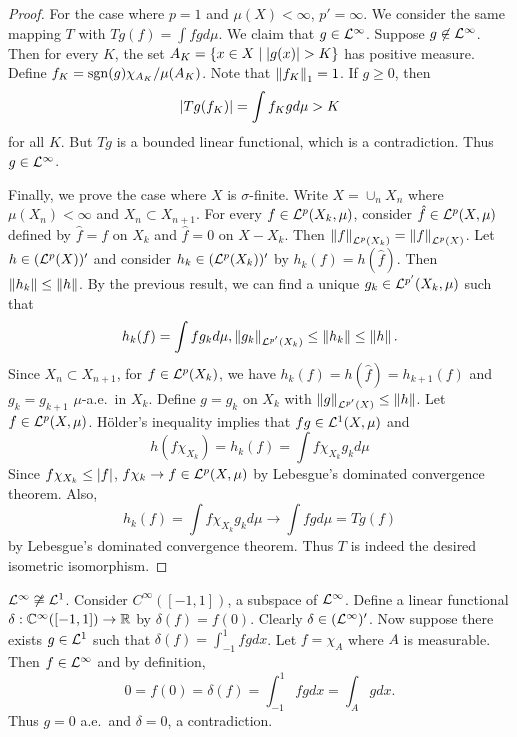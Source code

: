 \begin{proof}
    For the case where $p=1$ and $\mu(X)<\infty$, $p'=\infty$. 
    We consider the same mapping $T$ with $Tg(f) = \int fg d\mu$. 
    We claim that $g\in\mathcal{L}^\infty$. Suppose $g\not\in\mathcal{L}^\infty$. 
    Then for every $K$, the set $A_K = \left\{ x\in X \;\middle\vert\; \left\lvert {g(x)} \right\rvert>K \right\}$ 
    has positive measure. Define $f_K = \operatorname{sgn}(g)\chi_{A_K}/\mu(A_K)$. 
    Note that $\left\lVert {f_K} \right\rVert_1 = 1$. If $g\geq 0$, then 
    \begin{equation*}
        \left\lvert {Tg(f_K)} \right\rvert = \int f_Kgd\mu > K
    \end{equation*}
    for all $K$. But $Tg$ is a bounded linear functional, 
    which is a contradiction. Thus $g\in\mathcal{L}^\infty$. 

    Finally, we prove the case where $X$ is $\sigma$-finite. 
    Write $X = \cup_n X_n$ where $\mu(X_n)<\infty$ and $X_n\subset 
    X_{n+1}$. For every $f\in\mathcal{L}^p(X_k,\mu)$, consider 
    $\hat{f}\in\mathcal{L}^p(X,\mu)$ defined by $\hat{f} = f$ on $X_k$ 
    and $\hat{f} = 0$ on $X-X_k$. Then $\left\lVert {f} \right\rVert_{\mathcal{L}^p(X_k)} 
    = \left\lVert {f} \right\rVert_{\mathcal{L}^p(X)}$. Let $h\in(\mathcal{L}^p(X))'$ and consider 
    $h_k\in (\mathcal{L}^p(X_k))'$ by $h_k(f) = h(\hat{f})$. Then 
    $\left\lVert {h_k} \right\rVert\leq\left\lVert {h} \right\rVert$. By the previous result, we can 
    find a unique $g_k\in\mathcal{L}^{p'}(X_k,\mu)$ such that 
    \begin{equation*}
        h_k(f) = \int f g_k d\mu, \left\lVert {g_k} \right\rVert_{\mathcal{L}^{p'}(X_k)} 
        \leq \left\lVert {h_k} \right\rVert \leq \left\lVert {h} \right\rVert.
    \end{equation*}
    Since $X_n\subset X_{n+1}$, for $f\in\mathcal{L}^p(X_k)$, we have 
    $h_k(f) = h(\hat{f}) = h_{k+1}(f)$ and $g_k = g_{k+1}$ 
    $\mu$-a.e.\ in $X_k$. Define $g = g_k$ on $X_k$ with 
    $\left\lVert {g} \right\rVert_{\mathcal{L}^{p'}(X)}\leq \left\lVert {h} \right\rVert$. Let $f\in\mathcal{L}^p(X,\mu)$. 
    H\"older's inequality implies that $fg\in\mathcal{L}^1(X,\mu)$ and 
    \begin{equation*}
        h(f\chi_{X_k}) = h_k(f) = \int f\chi_{X_k}g_kd\mu
    \end{equation*}
    Since $f\chi_{X_k}\leq \left\lvert {f} \right\rvert$, $f\chi_k\to f\in \mathcal{L}^p(X,\mu)$ 
    by Lebesgue's dominated convergence theorem. Also, 
    \begin{equation*}
        h_k(f) = \int f\chi_{X_k}g_kd\mu \to \int fgd\mu = Tg(f)
    \end{equation*}
    by Lebesgue's dominated convergence theorem. Thus $T$ is 
    indeed the desired isometric isomorphism.
\end{proof}
\begin{remark}
    $\mathcal{L}^\infty\not\cong\mathcal{L}^1$. Consider $C^\infty([-1,1])$, 
    a subspace of $\mathcal{L}^\infty$. Define a linear functional 
    $\delta:\mathbb{C}^\infty([-1,1])\to\mathbb{R}$ by $\delta(f) = f(0)$. 
    Clearly $\delta\in(\mathcal{L}^\infty)'$. Now suppose there exists 
    $g\in\mathcal{L}^1$ such that $\delta(f) = \int_{-1}^{1} fgdx$. 
    Let $f = \chi_A$ where $A$ is measurable. Then 
    $f\in\mathcal{L}^\infty$ and by definition, 
    \begin{equation*}
        0 = f(0) = \delta(f) = \int_{-1}^{1} fgdx = \int_A gdx.
    \end{equation*}
    Thus $g = 0$ a.e.\ and $\delta = 0$, a contradiction.
\end{remark}

